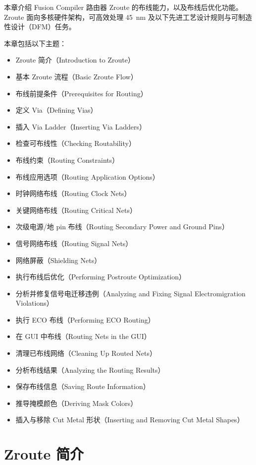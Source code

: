 \label{chap:route}

本章介绍 Fusion Compiler 路由器 Zroute 的布线能力，以及布线后优化功能。Zroute 面向多核硬件架构，可高效处理 45~nm 及以下先进工艺设计规则与可制造性设计（DFM）任务。

本章包括以下主题：
\begin{itemize}
  \item Zroute 简介（Introduction to Zroute）
  \item 基本 Zroute 流程（Basic Zroute Flow）
  \item 布线前提条件（Prerequisites for Routing）
  \item 定义 Via（Defining Vias）
  \item 插入 Via Ladder（Inserting Via Ladders）
  \item 检查可布线性（Checking Routability）
  \item 布线约束（Routing Constraints）
  \item 布线应用选项（Routing Application Options）
  \item 时钟网络布线（Routing Clock Nets）
  \item 关键网络布线（Routing Critical Nets）
  \item 次级电源/地 pin 布线（Routing Secondary Power and Ground Pins）
  \item 信号网络布线（Routing Signal Nets）
  \item 网络屏蔽（Shielding Nets）
  \item 执行布线后优化（Performing Postroute Optimization）
  \item 分析并修复信号电迁移违例（Analyzing and Fixing Signal Electromigration Violations）
  \item 执行 ECO 布线（Performing ECO Routing）
  \item 在 GUI 中布线（Routing Nets in the GUI）
  \item 清理已布线网络（Cleaning Up Routed Nets）
  \item 分析布线结果（Analyzing the Routing Results）
  \item 保存布线信息（Saving Route Information）
  \item 推导掩模颜色（Deriving Mask Colors）
  \item 插入与移除 Cut Metal 形状（Inserting and Removing Cut Metal Shapes）
\end{itemize}

\section{Zroute 简介}
